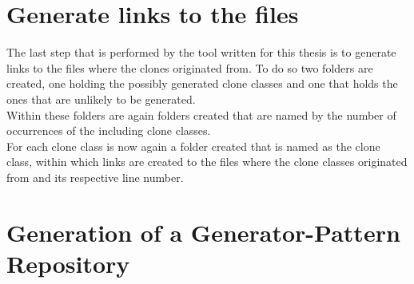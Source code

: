 \section{Generate links to the files}
The last step that is performed by the tool written for this thesis is to generate links to the files where the clones originated from. To do so two folders are created, one holding the possibly generated clone classes and one that holds the ones that are unlikely to be generated.\\
Within these folders are again folders created that are named by the number of occurrences of the including clone classes.\\
For each clone class is now again a folder created that is named as the clone class, within which links are created to the files where the clone classes originated from and its respective line number.


\section{Generation of a Generator-Pattern Repository}


